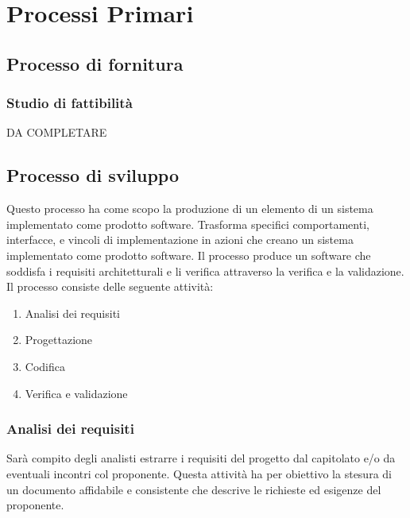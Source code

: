 \documentclass[a4paper,11pt]{article}
\begin{document}
	\newpage
	\section{Processi Primari}
	\subsection{Processo di fornitura}
		\subsubsection{Studio di fattibilità}	
	DA COMPLETARE
	
		\subsection{Processo di sviluppo}	
		Questo processo ha come scopo la produzione di un elemento di un sistema implementato come prodotto software. Trasforma specifici comportamenti, interfacce, e vincoli di implementazione in azioni che creano un sistema implementato come prodotto software. Il processo produce un software che soddisfa i requisiti architetturali e li verifica attraverso la	verifica e la validazione.	
		Il processo consiste delle seguente attività:
			\begin{enumerate}
				\item Analisi dei requisiti
				\item Progettazione
				\item Codifica
				\item Verifica e validazione
			\end{enumerate}
		\subsubsection{Analisi dei requisiti}
		Sarà compito degli analisti estrarre i requisiti del progetto dal capitolato e/o da eventuali incontri col proponente. Questa attività ha per obiettivo la stesura di un documento affidabile e consistente che descrive le richieste ed esigenze del proponente.
\end{document}
